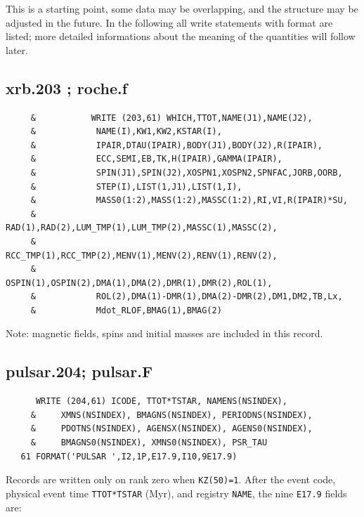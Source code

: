 This is a starting point, some data may be overlapping, and the structure may be adjusted in the future. In the following all write statements with format are listed; more detailed informations about the meaning of the quantities will follow later. 

\subsection{xrb.203 ; roche.f }
\begin{verbatim}
     &           WRITE (203,61) WHICH,TTOT,NAME(J1),NAME(J2),
     &            NAME(I),KW1,KW2,KSTAR(I),
     &            IPAIR,DTAU(IPAIR),BODY(J1),BODY(J2),R(IPAIR),
     &            ECC,SEMI,EB,TK,H(IPAIR),GAMMA(IPAIR),
     &            SPIN(J1),SPIN(J2),XOSPN1,XOSPN2,SPNFAC,JORB,OORB,
     &            STEP(I),LIST(1,J1),LIST(1,I),
     &            MASS0(1:2),MASS(1:2),MASSC(1:2),RI,VI,R(IPAIR)*SU,
     &            RAD(1),RAD(2),LUM_TMP(1),LUM_TMP(2),MASSC(1),MASSC(2),
     &            RCC_TMP(1),RCC_TMP(2),MENV(1),MENV(2),RENV(1),RENV(2),
     &            OSPIN(1),OSPIN(2),DMA(1),DMA(2),DMR(1),DMR(2),ROL(1),
     &            ROL(2),DMA(1)-DMR(1),DMA(2)-DMR(2),DM1,DM2,TB,Lx,
     &            Mdot_RLOF,BMAG(1),BMAG(2)
\end{verbatim}
 Note: magnetic fields, spins and initial masses are included in this record.

\subsection{pulsar.204; pulsar.F }
\begin{verbatim}
      WRITE (204,61) ICODE, TTOT*TSTAR, NAMENS(NSINDEX),
     &     XMNS(NSINDEX), BMAGNS(NSINDEX), PERIODNS(NSINDEX),
     &     PDOTNS(NSINDEX), AGENSX(NSINDEX), AGENS0(NSINDEX),
     &     BMAGNS0(NSINDEX), XMNS0(NSINDEX), PSR_TAU
   61 FORMAT('PULSAR ',I2,1P,E17.9,I10,9E17.9)
\end{verbatim}

Records are written only on rank zero when \texttt{KZ(50)=1}. After the event code, physical event time \texttt{TTOT*TSTAR} (Myr), and registry \texttt{NAME}, the nine \texttt{E17.9} fields are:

